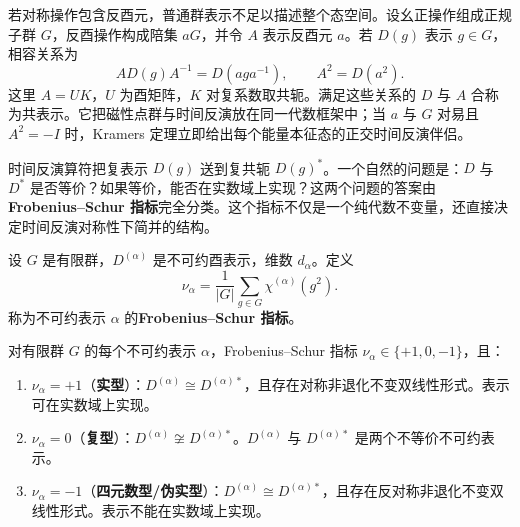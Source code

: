 若对称操作包含反酉元，普通群表示不足以描述整个态空间。设幺正操作组成正规子群 $G$，反酉操作构成陪集 $aG$，并令 $A$ 表示反酉元 $a$。若 $D(g)$ 表示 $g\in G$，相容关系为
\[
A D(g)A^{-1}=D(aga^{-1}),\qquad A^2=D(a^2).
\]
这里 $A=UK$，$U$ 为酉矩阵，$K$ 对复系数取共轭。满足这些关系的 $D$ 与 $A$ 合称为共表示。它把磁性点群与时间反演放在同一代数框架中；当 $a$ 与 $G$ 对易且 $A^2=-I$ 时，Kramers 定理立即给出每个能量本征态的正交时间反演伴侣。


时间反演算符把复表示 $D(g)$ 送到复共轭 $D(g)^*$。一个自然的问题是：$D$ 与 $D^*$ 是否等价？如果等价，能否在实数域上实现？这两个问题的答案由\textbf{Frobenius--Schur 指标}完全分类。这个指标不仅是一个纯代数不变量，还直接决定时间反演对称性下简并的结构。

\begin{definition}
设 $G$ 是有限群，$D^{(\alpha)}$ 是不可约酉表示，维数 $d_\alpha$。定义
\begin{equation}
\nu_\alpha
=\frac{1}{|G|}\sum_{g\in G}\chi^{(\alpha)}(g^2).
\label{eq:frobenius-schur-indicator}
\end{equation}
称为不可约表示 $\alpha$ 的\textbf{Frobenius--Schur 指标}。
\label{def:frobenius-schur-indicator}
\end{definition}

\begin{theorem}
对有限群 $G$ 的每个不可约表示 $\alpha$，Frobenius--Schur 指标 $\nu_\alpha\in\{+1,0,-1\}$，且：
\begin{enumerate}[label=(\roman*),leftmargin=3em]
\item $\nu_\alpha=+1$（\textbf{实型}）：$D^{(\alpha)}\cong D^{(\alpha)*}$，且存在对称非退化不变双线性形式。表示可在实数域上实现。
\item $\nu_\alpha=0$（\textbf{复型}）：$D^{(\alpha)}\not\cong D^{(\alpha)*}$。$D^{(\alpha)}$ 与 $D^{(\alpha)*}$ 是两个不等价不可约表示。
\item $\nu_\alpha=-1$（\textbf{四元数型/伪实型}）：$D^{(\alpha)}\cong D^{(\alpha)*}$，且存在反对称非退化不变双线性形式。表示不能在实数域上实现。
\end{enumerate}
\label{thm:frobenius-schur-classification}
\end{theorem}

